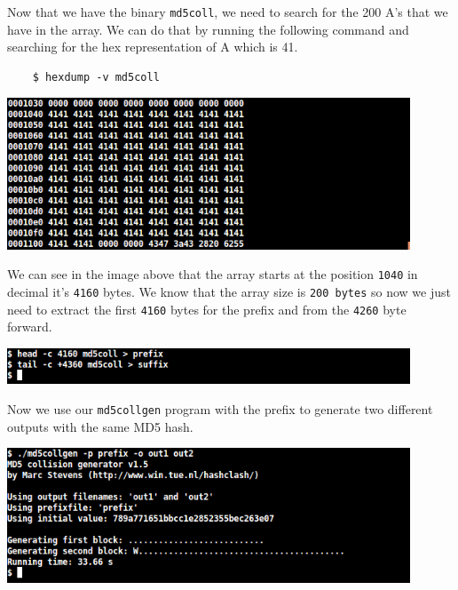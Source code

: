 \documentclass[a4paper]{article}
\begin{document}
\bigskip

Now that we have the binary \texttt{md5coll}, we need to search for the 200 A's that we have in the array. We can do that by running the following command and searching for the hex representation of A which is 41.

\begin{verbatim}
    $ hexdump -v md5coll
\end{verbatim}

\bigskip

\includegraphics[width=0.9\textwidth]{bash/md5colldump.png}

\bigskip

We can see in the image above that the array starts at the position \texttt{1040} in decimal it's \texttt{4160} bytes. We know that the array size is \texttt{200 bytes} so now we just need to extract the first \texttt{4160} bytes for the prefix and from the \texttt{4260} byte forward.

\bigskip

\includegraphics[width=0.9\textwidth]{bash/md5collcrop.png}

\bigskip

Now we use our \texttt{md5collgen} program with the prefix to generate two different outputs with the same MD5 hash.

\bigskip

\includegraphics[width=0.9\textwidth]{bash/md5collgenerate.png}

\bigskip
\end{document}
